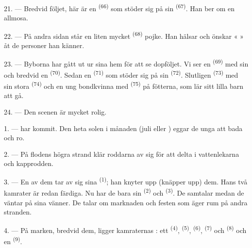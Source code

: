 \VUsaut{4.6mm}
\VUsaut{3.4mm}

21. --- Bredvid följet, här är en  \textsuperscript{(66)} som stöder sig på
sin  \textsuperscript{(67)}. Han ber om en allmosa.

22. --- På andra sidan står en liten mycket  \textsuperscript{(68)} pojke. Han
hälsar och önskar «  » åt de personer han känner.

23. --- Byborna har gått ut ur sina hem för att se dopföljet. Vi ser en
 \textsuperscript{(69)} med sin  och bredvid
en  \textsuperscript{(70)}. Sedan en 
\textsuperscript{(71)} som stöder sig på sin  \textsuperscript{(72)}. Slutligen
 \textsuperscript{(73)} med sin stora 
\textsuperscript{(74)} och en ung bondkvinna med
 \textsuperscript{(75)} på fötterna, som lär sitt lilla barn att
gå.

24. --- Den scenen är mycket rolig.
\VUsaut{4.0mm}

\VUsaut{3.0mm}

\VUsaut{2.4mm}

\VUsaut{3.0mm}

1. ---  har kommit. Den heta solen i månaden  (juli eller
) eggar de unga att bada och ro.

2. --- På flodens högra strand klär roddarna av sig för att delta i vattenlekarna och
kapprodden.

3. --- En av dem tar av sig sina  \textsuperscript{(1)}; han knyter upp (knäpper
upp) dem. Hans två kamrater är redan färdiga. Nu har de bara sin 
\textsuperscript{(2)} och  \textsuperscript{(3)}. De samtalar medan de väntar
på sina vänner. De talar om marknaden och festen som äger rum på andra stranden.

4. --- På marken, bredvid dem, ligger kamraternas : ett
  \textsuperscript{(4)}, 
\textsuperscript{(5)},  \textsuperscript{(6)},
 \textsuperscript{(7)} och 
\textsuperscript{(8)} och en  \textsuperscript{(9)}.


